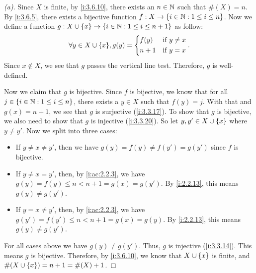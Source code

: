 \begin{proof}[(a)]
  Since \(X\) is finite, by \cref{i:3.6.10}, there exists an \(n \in \mathbb{N}\) such that \(\#(X) = n\).
  By \cref{i:3.6.5}, there exists a bijective function \(f : X \to \left\lbrace i \in \mathbb{N} : 1 \leq i \leq n\right\rbrace\).
  Now we define a function \(g : X \cup \left\lbrace x\right\rbrace \to \left\lbrace i \in \mathbb{N} : 1 \leq i \leq n + 1\right\rbrace\) as follow:
  \[
    \forall y \in X \cup \set{x}, g(y) = \begin{dcases}
      f(y)  & \text{if } y \neq x \\
      n + 1 & \text{if } y = x
    \end{dcases}.
  \]
  Since \(x \notin X\), we see that \(g\) passes the vertical line test.
  Therefore, \(g\) is well-defined.

  Now we claim that \(g\) is bijective.
  Since \(f\) is bijective, we know that for all \(j \in \left\lbrace i \in \mathbb{N} : 1 \leq i \leq n\right\rbrace\), there exists a \(y \in X\) such that \(f(y) = j\).
  With that and \(g(x) = n + 1\), we see that \(g\) is surjective (\cref{i:3.3.17}).
  To show that \(g\) is bijective, we also need to show that \(g\) is injective (\cref{i:3.3.20}).
  So let \(y, y' \in X \cup \left\lbrace x\right\rbrace\) where \(y \neq y'\).
  Now we split into three cases:
  \begin{itemize}
    \item If \(y \neq x \neq y'\), then we have \(g(y) = f(y) \neq f(y') = g(y')\) since \(f\) is bijective.
    \item If \(y \neq x = y'\), then, by \cref{i:ac:2.2.3}, we have \(g(y) = f(y) \leq n < n + 1 = g(x) = g(y')\).
          By \cref{i:2.2.13}, this means \(g(y) \neq g(y')\).
    \item If \(y = x \neq y'\), then, by \cref{i:ac:2.2.3}, we have \(g(y') = f(y') \leq n < n + 1 = g(x) = g(y)\).
          By \cref{i:2.2.13}, this means \(g(y) \neq g(y')\).
  \end{itemize}
  For all cases above we have \(g(y) \neq g(y')\).
  Thus, \(g\) is injective (\cref{i:3.3.14}).
  This means \(g\) is bijective.
  Therefore, by \cref{i:3.6.10}, we know that \(X \cup \left\lbrace x\right\rbrace\) is finite, and \(\#(X \cup \left\lbrace x\right\rbrace) = n + 1 = \#(X) + 1\).
\end{proof}

